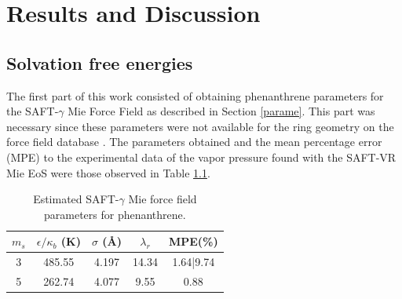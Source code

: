 \chapter{Results and Discussion} %

\label{Chapter5} %

\section{Solvation free energies}

The first part of this work consisted of obtaining phenanthrene parameters for the SAFT-$\gamma$ Mie Force Field as described in Section \ref{parame}. This part was necessary since these parameters were not available for the ring geometry on the force field database \cite{ervik2016}. The parameters obtained and the mean percentage error (MPE) to the experimental data \cite{pvphen} of the vapor pressure found with the SAFT-VR Mie EoS  were those observed in Table \ref{tbl:estimparameters}.

\begin{table}[h]
	\centering
	\caption{Estimated SAFT-$\gamma$ Mie force field parameters for phenanthrene.}
	\label{tbl:estimparameters}
	\begin{tabular}{ccccc}
		\hline\hline
		$m_s$                & $\epsilon/\kappa_{b}$ (K) & $\sigma$ (\AA) & $\lambda_r$ & MPE(\%)   \\ \hline\hline
		3 \cite{lafitte2012} & 485.55               & 4.197              & 14.34       & 1.64|9.74 \\
		5  \cite{muller2017} & 262.74               & 4.077              & 9.55        & 0.88      \\ \hline\hline
	\end{tabular}
	
\end{table} 

